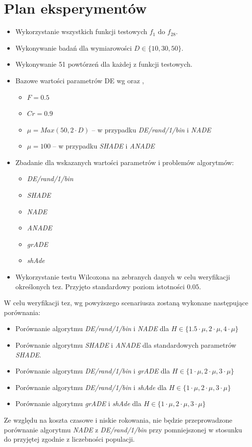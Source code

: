 \documentclass[12pt,a4paper]{report}
\begin{document}
{{{{{{{\section{Plan eksperymentów}
\par{
\begin{itemize}
\item Wykorzystanie wszystkich funkcji testowych $f_1$ do $f_{28}$.
\item Wykonywanie badań dla wymiarowości $D \in \{10, 30, 50\}$.
\item Wykonywanie 51 powtórzeń dla każdej z funkcji testowych.
\item Bazowe wartości parametrów DE wg \cite{CEC2013DEbasic} oraz \cite{SHADE},
\begin{itemize}
\item $F = 0.5$
\item $Cr = 0.9$
\item $\mu = Max(50, 2 \cdot D)$ -- w przypadku \emph{DE/rand/1/bin} i \emph{NADE}
\item $\mu = 100$ -- w przypadku \emph{SHADE} i \emph{ANADE}
\end{itemize}
\item Zbadanie dla wskazanych wartości parametrów i problemów algorytmów:
\begin{itemize}
\item \emph{DE/rand/1/bin}
\item \emph{SHADE}
\item \emph{NADE}
\item \emph{ANADE}
\item \emph{grADE}
\item \emph{shAde}
\end{itemize}

\item Wykorzystanie testu Wilcoxona na zebranych danych w celu weryfikacji określonych tez. Przyjęto standardowy poziom istotności $0.05$.
\end{itemize}
}
\par{
W celu weryfikacji tez, wg powyższego scenariusza zostaną wykonane następujące porównania:
\begin{itemize}
\item Porównanie algorytmu \emph{DE/rand/1/bin} i \emph{NADE} dla $H \in \{1.5 \cdot \mu, 2 \cdot \mu, 4 \cdot \mu \}$
\item Porównanie algorytmu \emph{SHADE} i \emph{ANADE} dla standardowych parametrów \emph{SHADE}.
\item Porównanie algorytmu \emph{DE/rand/1/bin} i \emph{grADE} dla $H \in \{1 \cdot \mu, 2 \cdot \mu, 3 \cdot \mu \}$
\item Porównanie algorytmu \emph{DE/rand/1/bin} i \emph{shAde} dla $H \in \{1 \cdot \mu, 2 \cdot \mu, 3 \cdot \mu \}$
\item Porównanie algorytmu \emph{grADE} i \emph{shAde} dla $H \in \{1 \cdot \mu, 2 \cdot \mu, 3 \cdot \mu \}$
\end{itemize}
}
\par{
Ze względu na koszta czasowe i niskie rokowania, nie będzie przeprowadzone porównanie algorytmu \emph{NADE} z \emph{DE/rand/1/bin} przy pomniejszonej w stosunku do przyjętej zgodnie z \cite{CEC2013DEbasic} liczebności populacji.
}

}}}}}}}
\end{document}
